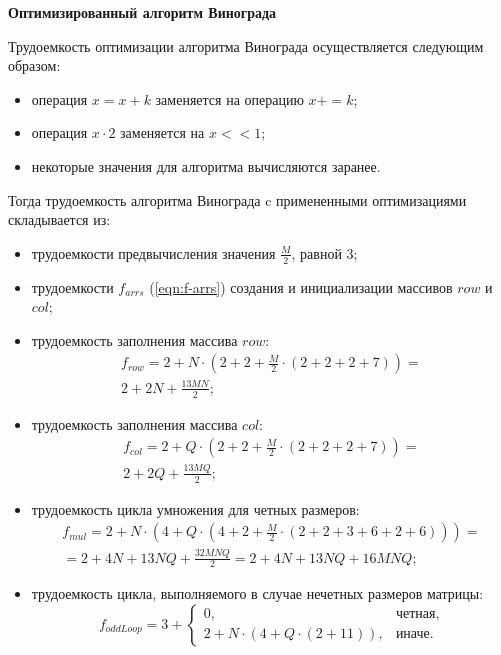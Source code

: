 \textbf{Оптимизированный алгоритм Винограда}

Трудоемкость оптимизации алгоритма Винограда осуществляется следующим образом:
\begin{itemize}
	\item операция $x = x + k$ заменяется на операцию $x += k$;
	\item операция $x \cdot 2$ заменяется на $x << 1$;
	\item некоторые значения для алгоритма вычисляются заранее.
\end{itemize}

Тогда трудоемкость алгоритма Винограда c примененными оптимизациями складывается из:
\begin{itemize}
	\item трудоемкости предвычисления значения $\frac{M}{2}$, равной 3;
	\item трудоемкости $f_{arrs}$ (\ref{eqn:f-arrs}) создания и инициализации массивов $row$ и $col$;
	\item трудоемкость заполнения массива $row$:
	\begin{equation}
		\begin{gathered}
			f_{row} = 2 + N \cdot (2 + 2 + \frac{M}{2} \cdot (2 + 2 + 2 + 7)) = \\
			2 + 2N + \frac{13MN}{2};
		\end{gathered}
	\end{equation}
	\item трудоемкость заполнения массива $col$:
	\begin{equation}
		\begin{gathered}
			f_{col} = 2 + Q \cdot (2 + 2 + \frac{M}{2} \cdot (2 + 2 + 2 + 7)) = \\
			2 + 2Q + \frac{13MQ}{2};
		\end{gathered}
	\end{equation}
	\item трудоемкость цикла умножения для четных размеров:
	\begin{equation}
		\begin{gathered}
			f_{mul} = 2 + N \cdot (4 + Q \cdot (4 + 2 + \frac{M}{2} \cdot (2 + 2 + 3 + 6 + 2 + 6))) = \\
			= 2 + 4N + 13NQ + \frac{32MNQ}{2} = 2 + 4N + 13NQ + 16MNQ;
		\end{gathered}
	\end{equation}
	\item трудоемкость цикла, выполняемого в случае нечетных размеров матрицы:
	\begin{equation}
		f_{oddLoop} = 3 + 
		\begin{cases}
			0, & \text{четная,} \\
			2 + N \cdot (4 + Q \cdot (2 + 11)), & \text{иначе.}
		\end{cases}
	\end{equation}
\end{itemize}
